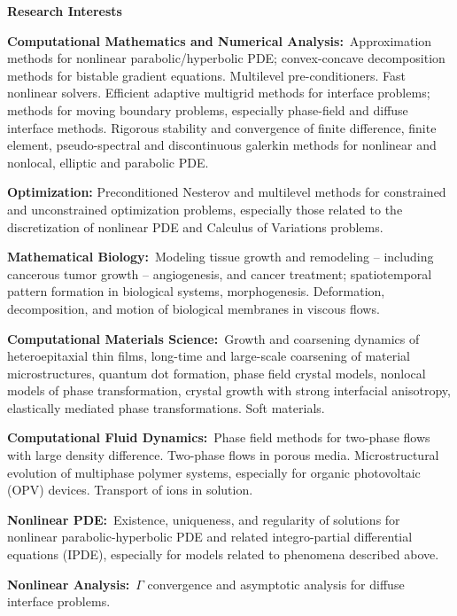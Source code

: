 \documentclass[11pt]{letter}
\begin{document}
{\LARGE\bf  Research Interests}
    \begin{description}
    \item
\textbf{Computational Mathematics and Numerical Analysis:}~Approximation methods for nonlinear parabolic/hyperbolic PDE; convex-concave decomposition methods for bistable gradient equations. Multilevel pre-conditioners. Fast nonlinear solvers. Efficient adaptive multigrid methods for interface problems; methods for moving boundary problems, especially phase-field and diffuse interface methods. Rigorous stability and convergence of finite difference, finite element, pseudo-spectral and discontinuous galerkin methods for nonlinear and nonlocal, elliptic and parabolic PDE.
	\item
\textbf{Optimization:} Preconditioned Nesterov and multilevel methods for constrained and unconstrained optimization problems, especially those related to the discretization of nonlinear PDE and Calculus of Variations problems.

	\item
\textbf{Mathematical Biology:}~Modeling tissue growth and remodeling -- including cancerous tumor growth -- angiogenesis, and cancer treatment; spatiotemporal pattern formation in biological systems, morphogenesis.  Deformation, decomposition, and motion of biological membranes in viscous flows.
	\item
\textbf{Computational Materials Science:}~Growth and coarsening dynamics of heteroepitaxial thin films, long-time and large-scale coarsening of material microstructures, quantum dot formation, phase field crystal models, nonlocal models of phase transformation, crystal growth with strong interfacial anisotropy, elastically mediated phase transformations. Soft materials.
	\item
\textbf{Computational Fluid Dynamics:}~Phase field methods for two-phase flows with large density difference. Two-phase flows in porous media. Microstructural evolution of multiphase polymer systems, especially for organic photovoltaic (OPV) devices. Transport of ions in solution.
	\item
\textbf{Nonlinear PDE:}~Existence, uniqueness, and regularity of solutions for nonlinear parabolic-hyperbolic PDE and related integro-partial differential equations (IPDE), especially for models related to phenomena described above.
	\item
\textbf{Nonlinear Analysis:}~$\Gamma$ convergence and asymptotic analysis for diffuse interface problems.
    \end{description}
\end{document}
